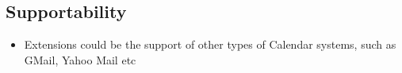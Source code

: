 \subsection*{Supportability}
\begin{itemize}
	\item Extensions could be the support of other types of Calendar systems, such as GMail, Yahoo Mail etc
\end{itemize}